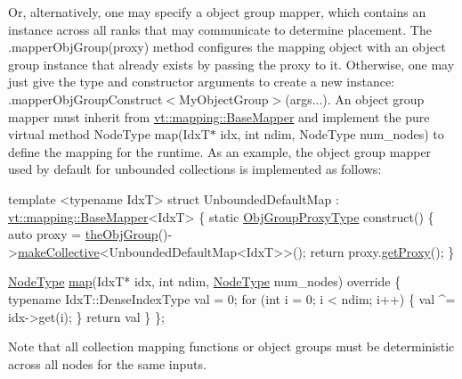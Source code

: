 Or, alternatively, one may specify a object group mapper, which contains an instance across all ranks that may communicate to determine placement. The {\ttfamily .mapper\+Obj\+Group(proxy)} method configures the mapping object with an object group instance that already exists by passing the proxy to it. Otherwise, one may just give the type and constructor arguments to create a new instance\+: {\ttfamily .mapper\+Obj\+Group\+Construct$<$My\+Object\+Group$>$(args...)}. An object group mapper must inherit from {\ttfamily \hyperlink{structvt_1_1mapping_1_1_base_mapper}{vt\+::mapping\+::\+Base\+Mapper}} and implement the pure virtual method {\ttfamily Node\+Type map(\+Idx\+T$\ast$ idx, int ndim, Node\+Type num\+\_\+nodes)} to define the mapping for the runtime. As an example, the object group mapper used by default for unbounded collections is implemented as follows\+:


\begin{DoxyCode}
\textcolor{keyword}{template} <\textcolor{keyword}{typename} IdxT>
\textcolor{keyword}{struct }UnboundedDefaultMap : \hyperlink{structvt_1_1mapping_1_1_base_mapper}{vt::mapping::BaseMapper}<IdxT> \{
  \textcolor{keyword}{static} \hyperlink{namespacevt_ad7cae989df485fccca57f0792a880a8e}{ObjGroupProxyType} construct() \{
    \textcolor{keyword}{auto} proxy = \hyperlink{namespacevt_a833f0115b692f578167cbd88e30d39c5}{theObjGroup}()->\hyperlink{structvt_1_1objgroup_1_1_obj_group_manager_a50e0d8498d142a05773ed5a046803b2b}{makeCollective}<UnboundedDefaultMap<IdxT>>();
    \textcolor{keywordflow}{return} proxy.\hyperlink{structvt_1_1objgroup_1_1proxy_1_1_proxy_a76cda2351cf7801abe2ebffa1403c5b8}{getProxy}();
  \}

  \hyperlink{namespacevt_a866da9d0efc19c0a1ce79e9e492f47e2}{NodeType} \hyperlink{structvt_1_1mapping_1_1_base_mapper_a940a3ea301c0f60b2b88218afbce5a4f}{map}(IdxT* idx, \textcolor{keywordtype}{int} ndim, \hyperlink{namespacevt_a866da9d0efc19c0a1ce79e9e492f47e2}{NodeType} num\_nodes)\textcolor{keyword}{ override }\{
    \textcolor{keyword}{typename} IdxT::DenseIndexType val = 0;
    \textcolor{keywordflow}{for} (\textcolor{keywordtype}{int} i = 0; i < ndim; i++) \{
      val ^= idx->get(i);
    \}
    \textcolor{keywordflow}{return} val %
  \}
\};
\end{DoxyCode}


Note that all collection mapping functions or object groups must be deterministic across all nodes for the same inputs.

